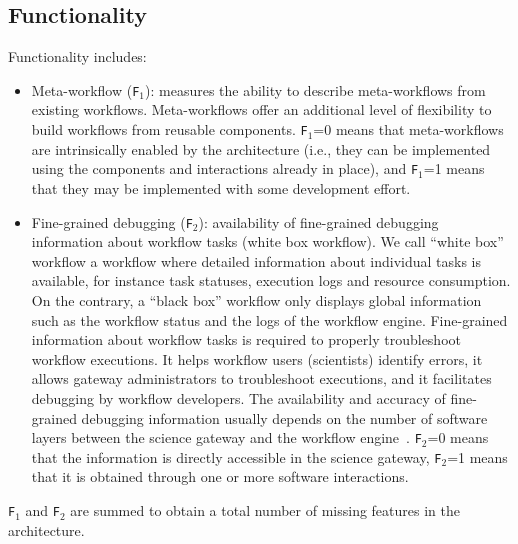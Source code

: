 \documentclass[preprint,3p,twocolumn]{elsarticle}
\newcommand{\correction}[1]{\color{blue}#1\color{black}\xspace}
\begin{document}
\subsection{\correction{Functionality}}

\correction{Functionality includes}:
\begin{itemize}[leftmargin=0cm,itemindent=0.35cm,itemsep=0cm]
\item Meta-workflow (\texttt{\correction{F}$_1$}): measures the ability to describe
  meta-workflows from existing workflows. Meta-workflows offer an
  additional level of flexibility to build workflows from reusable
  components. \texttt{\correction{F}$_1$}=0 means that meta-workflows are
  intrinsically enabled by the architecture (i.e., they can be
  implemented using the components and interactions already in place),
  and \texttt{\correction{F}$_1$}=1 means that they may be implemented with some
  development effort.
  
\item Fine-grained debugging (\texttt{\correction{F}$_2$}): availability of
  fine-grained debugging information about workflow tasks (white box
  workflow). \correction{We call ``white box'' workflow a workflow
    where detailed information about individual tasks is available,
    for instance task statuses, execution logs and resource
    consumption. On the contrary, a ``black box'' workflow only
    displays global information such as the workflow status and the
    logs of the workflow engine.} Fine-grained information about
  workflow tasks is required to properly troubleshoot workflow
  executions. \correction{It helps workflow users (scientists)
    identify errors, it allows gateway administrators to troubleshoot
    executions, and it facilitates debugging by workflow
    developers}. \correction{The availability and accuracy of
    fine-grained debugging information} usually depends on the number
  of software layers between the science gateway and the workflow
  engine~\cite{olabarriaga2014}. \texttt{\correction{F}$_2$}=0 means that the
  information is directly accessible in the science gateway,
  \texttt{\correction{F}$_2$}=1 means that it is obtained through one or more
  software interactions.
\end{itemize}
\texttt{\correction{F}$_1$} and \texttt{\correction{F}$_2$} are summed to obtain a total number of missing 
features in the architecture.


\end{document}
